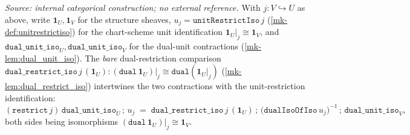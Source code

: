 \begin{lemma}\label{mk-lem:dual_unit_iso_restrict_assemble}
  \leanok

  \textit{Source: internal categorical construction; no external reference.}
  With \(j : V \hookrightarrow U\) as above, write \(\mathbf 1_U, \mathbf 1_V\) for the structure
  sheaves, \(u_j = \mathtt{unitRestrictIso}\,j\) (\ref{mk-def:unitrestrictiso}) for the chart-scheme
  unit identification \(\mathbf 1_U|_j \cong \mathbf 1_V\), and
  \(\mathtt{dual\_unit\_iso}_U, \mathtt{dual\_unit\_iso}_V\) for the dual-unit contractions
  (\ref{mk-lem:dual_unit_iso}). The \emph{bare} dual-restriction comparison
  \(\mathtt{dual\_restrict\_iso}\,j\,(\mathbf 1_U) : (\mathtt{dual}\,\mathbf 1_U)|_j \cong
  \mathtt{dual}(\mathbf 1_U|_j)\) (\ref{mk-lem:dual_restrict_iso}) intertwines the two contractions
  with the unit-restriction identification:
  \[
    (\mathtt{restrict}\,j)\,\mathtt{dual\_unit\_iso}_U \,\mathbin{;}\, u_j
      \;=\; \mathtt{dual\_restrict\_iso}\,j\,(\mathbf 1_U)
        \,\mathbin{;}\, \bigl(\mathtt{dualIsoOfIso}\,u_j\bigr)^{-1}
        \,\mathbin{;}\, \mathtt{dual\_unit\_iso}_V,
  \]
  both sides being isomorphisms \((\mathtt{dual}\,\mathbf 1_U)|_j \cong \mathbf 1_V\).
\end{lemma}

